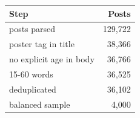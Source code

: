 \begin{tabular}{lr}
\toprule
Step & Posts \\
\midrule
posts parsed & 129{,}722 \\
poster tag in title & 38{,}366 \\
no explicit age in body & 36{,}766 \\
15-60 words & 36{,}525 \\
deduplicated & 36{,}102 \\
balanced sample & 4{,}000 \\
\bottomrule
\end{tabular}
